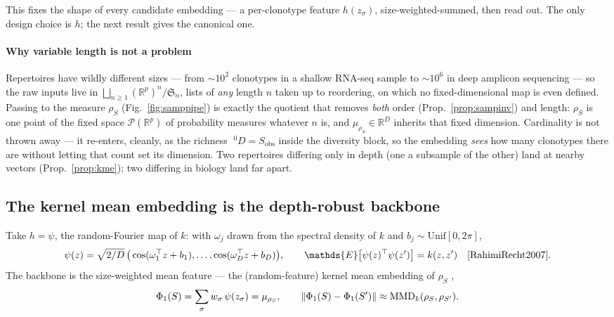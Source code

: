 \documentclass[11pt]{article}
\theoremstyle{oldplain}
\theoremstyle{oldrem}
\newcommand{\R}{\mathds{R}}  %
\newcommand{\E}{\mathds{E}}
\DeclarePairedDelimiter{\norm}{\lVert}{\rVert}
\begin{document}
This fixes the shape of every candidate embedding --- a per-clonotype feature $h(z_\sigma)$, size-weighted-summed,
then read out. The only design choice is $h$; the next result gives the canonical one.

\paragraph{Why variable length is not a problem} Repertoires have wildly different sizes --- from ${\sim}10^2$
clonotypes in a shallow {\scshape RNA}-seq sample to ${\sim}10^6$ in deep amplicon sequencing --- so the raw
inputs live in $\bigsqcup_{n\ge1}(\R^p)^n/\mathfrak S_n$, lists of \emph{any} length $n$ taken up to
reordering, on which no fixed-dimensional map is even defined. Passing to the measure $\rho_S$
(Fig.~\ref{fig:samppipe}) is exactly the quotient that removes \emph{both} order (Prop.~\ref{prop:sampinv})
and length: $\rho_S$ is one point of the fixed space $\mathcal P(\R^p)$ of probability measures whatever $n$
is, and $\mu_{\rho_S}\in\R^D$ inherits that fixed dimension. Cardinality is not thrown away --- it re-enters,
cleanly, as the richness $\;^0D=S_{\mathrm{obs}}$ inside the diversity block, so the embedding \emph{sees} how
many clonotypes there are without letting that count set its dimension. Two repertoires differing only in depth
(one a subsample of the other) land at nearby vectors (Prop.~\ref{prop:kme}); two differing in biology land far
apart.

\subsection{The kernel mean embedding is the depth-robust backbone}\label{sec:samp-kme}

Take $h=\psi$, the random-Fourier map of $k$: with $\omega_j$ drawn from the spectral density of $k$ and
$b_j\sim\mathrm{Unif}[0,2\pi]$,
\begin{equation}\label{eq:rff}
  \psi(z)=\sqrt{2/D}\,\big(\cos(\omega_1^\top z+b_1),\dots,\cos(\omega_D^\top z+b_D)\big),\qquad
  \E\big[\psi(z)^\top\psi(z')\big]=k(z,z')\quad\text{\cite{RahimiRecht2007}}.
\end{equation}
The backbone is the size-weighted mean feature --- the (random-feature) kernel mean embedding of $\rho_S$
\cite{Smola2007,Muandet2017},
\begin{equation}\label{eq:kme}
  \Phi_1(S)=\sum_\sigma w_\sigma\,\psi(z_\sigma)=\mu_{\rho_S},\qquad
  \norm{\Phi_1(S)-\Phi_1(S')}\approx\mathrm{MMD}_k(\rho_S,\rho_{S'}).
\end{equation}
\end{document}

